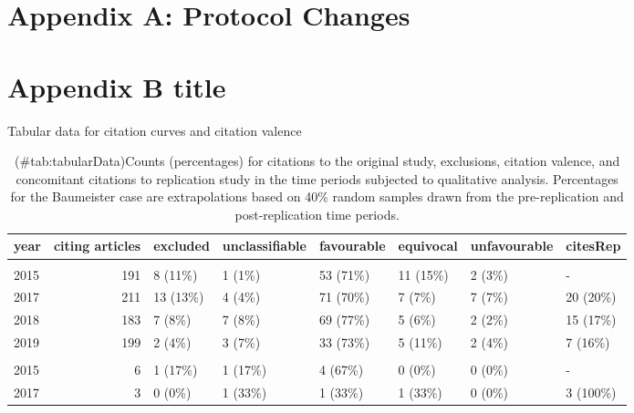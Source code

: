 \clearpage
\makeatletter
\efloat@restorefloats
\makeatother


\begin{appendix}
\hypertarget{appA}{%
\section{Appendix A: Protocol Changes}\label{appA}}

\hypertarget{appB}{%
\section{Appendix B title}\label{appB}}

Tabular data for citation curves and citation valence

\begin{longtable}[t]{lrllllll}
\caption{(\#tab:tabularData)Counts (percentages) for citations to the original study, exclusions, citation valence, and concomitant citations to replication study in the time periods subjected to qualitative analysis. Percentages for the Baumeister case are extrapolations based on 40\% random samples drawn from the pre-replication and post-replication time periods.}\\
\toprule
year & citing
articles & excluded & unclassifiable & favourable & equivocal & unfavourable & citesRep\\
\midrule
\addlinespace[0.3em]
\multicolumn{8}{l}{\textbf{Baumeister}}\\
\hspace{1em}2015 & 191 & 8 (11\%) & 1 (1\%) & 53 (71\%) & 11 (15\%) & 2 (3\%) & -\\
\hspace{1em}2017 & 211 & 13 (13\%) & 4 (4\%) & 71 (70\%) & 7 (7\%) & 7 (7\%) & 20 (20\%)\\
\hspace{1em}2018 & 183 & 7 (8\%) & 7 (8\%) & 69 (77\%) & 5 (6\%) & 2 (2\%) & 15 (17\%)\\
\hspace{1em}2019 & 199 & 2 (4\%) & 3 (7\%) & 33 (73\%) & 5 (11\%) & 2 (4\%) & 7 (16\%)\\
\addlinespace[0.3em]
\multicolumn{8}{l}{\textbf{Sripada}}\\
\hspace{1em}2015 & 6 & 1 (17\%) & 1 (17\%) & 4 (67\%) & 0 (0\%) & 0 (0\%) & -\\
\hspace{1em}2017 & 3 & 0 (0\%) & 1 (33\%) & 1 (33\%) & 1 (33\%) & 0 (0\%) & 3 (100\%)\\

\end{longtable}
\end{appendix}
